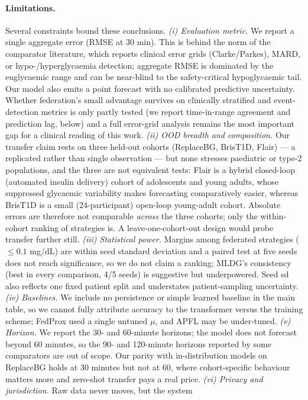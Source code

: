 \documentclass[10pt,letterpaper]{article}
\begin{document}
\paragraph{Limitations.} Several constraints bound these conclusions. \emph{(i)
Evaluation metric.} We report a single aggregate error (RMSE at 30 min). This is
behind the norm of the comparator literature, which reports clinical error grids
(Clarke/Parkes), MARD, or hypo-/hyperglycaemia detection; aggregate RMSE is
dominated by the euglycaemic range and can be near-blind to the safety-critical
hypoglycaemic tail. Our model also emits a point forecast with no calibrated
predictive uncertainty. Whether federation's small advantage survives on
clinically stratified and event-detection metrics is only partly tested (we
report time-in-range agreement and prediction lag, below) and a full error-grid
analysis remains the most important gap for a clinical reading of this work.
\emph{(ii) OOD breadth and composition.} Our transfer claim rests on three
held-out cohorts (ReplaceBG, BrisT1D, Flair) --- a replicated rather than single
observation --- but none stresses paediatric or type-2 populations, and the three
are not equivalent tests: Flair is a hybrid closed-loop (automated insulin
delivery) cohort of adolescents and young adults, whose suppressed glycaemic
variability makes forecasting comparatively easier, whereas BrisT1D is a small
(24-participant) open-loop young-adult cohort. Absolute errors are therefore not
comparable \emph{across} the three cohorts; only the within-cohort ranking of
strategies is. A leave-one-cohort-out design would probe transfer further still. \emph{(iii) Statistical power.} Margins among federated strategies
($\le 0.1$ mg/dL) are within seed standard deviation and a paired test at five
seeds does not reach significance, so we do not claim a ranking; MLDG's
consistency (best in every comparison, 4/5 seeds) is suggestive but underpowered.
Seed sd also reflects one fixed patient split and understates patient-sampling
uncertainty. \emph{(iv) Baselines.} We include no persistence or
simple learned baseline in the main table, so we cannot fully attribute accuracy
to the transformer versus the training scheme; FedProx used a single untuned
$\mu$, and APFL may be under-tuned. \emph{(v) Horizon.} We report the 30- and
60-minute horizons; the model does not forecast beyond 60 minutes, so the 90- and
120-minute horizons reported by some comparators are out of scope. Our parity with
in-distribution models on ReplaceBG holds at 30 minutes but not at 60, where
cohort-specific behaviour matters more and zero-shot transfer pays a real price. \emph{(vi) Privacy and jurisdiction.} Raw data never moves, but the system
\end{document}
